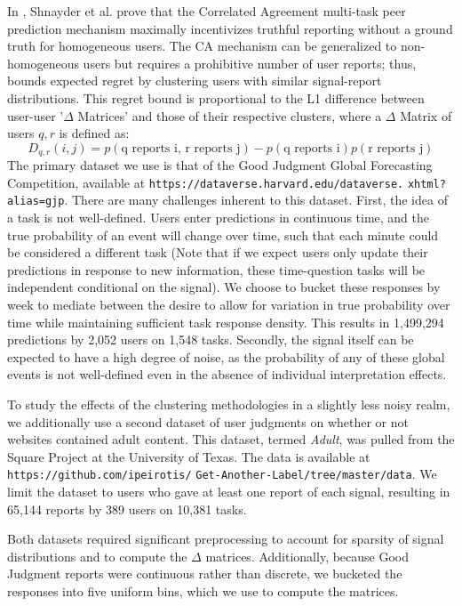 \documentclass{article}
\begin{document}
In \citet{shnayder2016informed}, Shnayder et al. prove that the Correlated Agreement multi-task peer prediction mechanism maximally incentivizes truthful reporting without a ground truth for homogeneous users. The CA mechanism can be generalized to non-homogeneous users but requires a prohibitive number of user reports; thus, \citet{agarwal2017} bounds expected regret by clustering users with similar signal-report distributions.  This regret bound is proportional to the L1 difference between user-user '$\Delta$ Matrices' and those of their respective clusters, where a $\Delta$ Matrix of users $q,r$ is defined as: $$D_{q,r}(i,j) = p(\textrm{q reports i, r reports j}) - p(\textrm{q reports i})p(\textrm{r reports j})$$
The primary dataset we use is that of the Good Judgment Global Forecasting Competition, available at \texttt{https://dataverse.harvard.edu/dataverse.}
\texttt{xhtml?alias=gjp}. There are many challenges inherent to this dataset. First, the idea of a task is not well-defined. Users enter predictions in continuous time, and the true probability of an event will change over time, such that each minute could be considered a different task (Note that if we expect users only update their predictions in response to new information, these time-question tasks will be independent conditional on the signal). We choose to bucket these responses by week to mediate between the desire to allow for variation in true probability over time while maintaining sufficient task response density. This results in 1,499,294 predictions by 2,052 users on 1,548 tasks. Secondly, the signal itself can be expected to have a high degree of noise, as the probability of any of these global events is not well-defined even in the absence of individual interpretation effects. 

To study the effects of the clustering methodologies in a slightly less noisy realm, we additionally use a second dataset of user judgments on whether or not websites contained adult content. This dataset, termed \emph{Adult}, was pulled from the Square Project at the University of Texas. The data is available at \texttt{https://github.com/ipeirotis/}
\texttt{Get-Another-Label/tree/master/data}. We limit the dataset to users who gave at least one report of each signal, resulting in 65,144 reports by 389 users on 10,381 tasks.

Both datasets required significant preprocessing to account for sparsity of signal distributions and to compute the $\Delta$ matrices. Additionally, because Good Judgment reports were continuous rather than discrete, we bucketed the responses into five uniform bins, which we use to compute the matrices.
\end{document}
